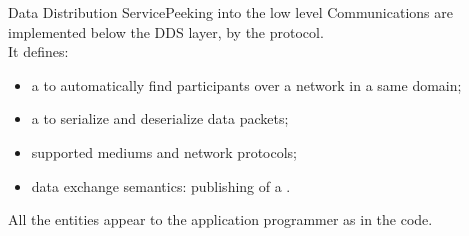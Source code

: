 \begin{frame}{Data Distribution Service}{Peeking into the low level}
  Communications are implemented below the DDS layer, by the  protocol.\\
  It defines:
  \begin{itemize}
    \item a  to automatically find participants over a network in a same domain;
    \item a  to serialize and deserialize data packets;
    \item supported mediums and network protocols;
    \item data exchange semantics: publishing  of a .
  \end{itemize}
  \bigskip
  All the entities appear to the application programmer as  in the code.
\end{frame}
